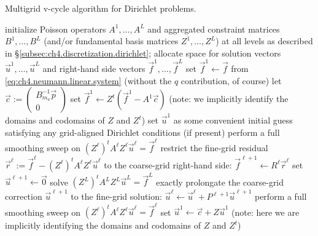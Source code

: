 \begin{algorithm}
\caption{Multigrid v-cycle algorithm for Dirichlet problems.}
\label{alg:ch4.multigrid.dirichlet.vcycle}
\begin{algorithmic}
\STATE initialize Poisson operators $A^1, \dotsc, A^L$ and aggregated constraint matrices $B^1, \dotsc, B^L$ (and/or fundamental basis matrices $Z^1, \dotsc, Z^L$) at all levels as described in \S\ref{subsec:ch4.discretization.dirichlet}; allocate space for solution vectors $\vec{u}^1, \dotsc, \vec{u}^L$ and right-hand side vectors $\vec{f}^1, \dotsc, \vec{f}^L$
\STATE set $\vec{f}^1 \leftarrow \vec{f}$ from \eqref{eq:ch4.neumann.linear.system} (without the $q$ contribution, of course)
\STATE let $\vec{c} := \begin{pmatrix} B_{m_a}^{-1} \vec{p} \\ 0 \end{pmatrix}$ 
\STATE set $\vec{f}^1 \leftarrow Z^t \left( \vec{f}^1 - A^1 \vec{c} \right)$ (note: we implicitly identify the domains and codomains of $Z$ and $Z^t$)
\STATE set $\vec{u}^1$ as some convenient initial guess satisfying any grid-aligned Dirichlet conditions (if present)
    \STATE perform a full smoothing sweep on $(Z^{\ell})^t A^{\ell} Z^{\ell} \vec{u}^{\ell} = \vec{f}^{\ell}$ 
    \STATE restrict the fine-grid residual $\vec{r}^{\ell} := \vec{f}^{\ell} - (Z^{\ell})^t A^{\ell} Z^{\ell} \vec{u}^{\ell}$ to the coarse-grid right-hand side: $\vec{f}^{\ell+1} \leftarrow R^{\ell} \vec{r}^{\ell}$ 
    \STATE set $\vec{u}^{\ell+1} \leftarrow \vec{0}$
\ENDFOR
\STATE solve $(Z^L)^t A^L Z^L \vec{u}^L = \vec{f}^L$ exactly 
    \STATE prolongate the coarse-grid correction $\vec{u}^{\ell+1}$ to the fine-grid solution: $\vec{u}^{\ell} \leftarrow \vec{u}^{\ell} + P^{\ell+1} \vec{u}^{\ell+1}$ 
    \STATE perform a full smoothing sweep on $(Z^{\ell})^t A^{\ell} Z^{\ell} \vec{u}^{\ell} = \vec{f}^{\ell}$ 
\ENDFOR
\STATE set $\vec{u}^1 \leftarrow \vec{c} + Z \vec{u}^1$ (note: here we are implicitly identifying the domains and codomains of $Z$ and $Z^t$)
\end{algorithmic}
\end{algorithm}

